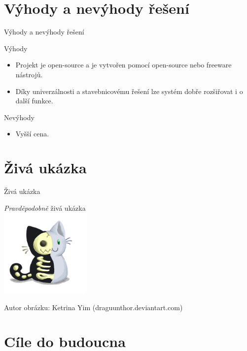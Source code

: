 \documentclass[11pt]{beamer}
\begin{document}
\section{Výhody a nevýhody řešení}

\begin{frame}{Výhody a nevýhody řešení}
  \begin{exampleblock}{Výhody}
    \begin{itemize}
      \item Projekt je open-source a je vytvořen pomocí open-source nebo freeware nástrojů.
      \item Díky univerzálnosti a stavebnicovému řešení lze systém dobře rozšiřovat i o další funkce.
    \end{itemize}
  \end{exampleblock}
  \begin{alertblock}{Nevýhody}
    \begin{itemize}
      \item Vyšší cena.
    \end{itemize}
  \end{alertblock}
\end{frame}

\section{Živá ukázka}
\begin{frame}{Živá ukázka}
  \begin{center}
    \huge{\textit{Pravděpodobně} živá ukázka} \\
    \vspace{8mm}
    \includegraphics[width = 0.33\textwidth]{../img/kocka.png}
    \vspace{8mm}
  \end{center}
  \small{Autor obrázku: Ketrina Yim (draguunthor.deviantart.com)}
\end{frame}

\section{Cíle do budoucna}
\end{document}
